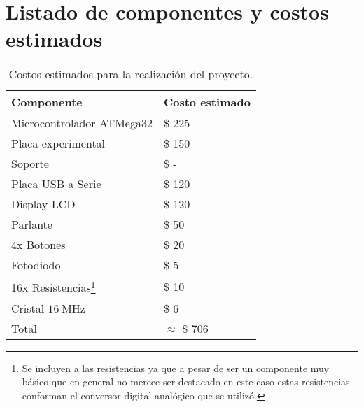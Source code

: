 \section{Listado de componentes y costos estimados}
\label{sec:componentes}

\begin{table}[H]
  \centering
  \begin{tabular}{ll}
    \toprule
    Componente & Costo estimado \\
    \midrule
    Microcontrolador ATMega32 & \$ 225 \\
    Placa experimental & \$ 150 \\
    Soporte & \$ - \\
    Placa USB a Serie & \$ 120 \\
	Display LCD  & \$ 120 \\
	Parlante & \$ 50 \\
    4x Botones & \$ 20 \\
    Fotodiodo & \$ 5 \\
    16x Resistencias\footnote{Se incluyen a las resistencias ya que a pesar de ser un componente muy básico que en general no merece ser destacado en este caso estas resistencias conforman el conversor digital-analógico que se utilizó.} & \$ 10\\
    Cristal $\SI{16}{\mega \hertz}$ & \$ 6 \\
    \midrule
    Total & $\approx$ \$ 706 \\
    \bottomrule
  \end{tabular}
  \caption{Costos estimados para la realización del proyecto.}
  \label{table:costos}
\end{table}